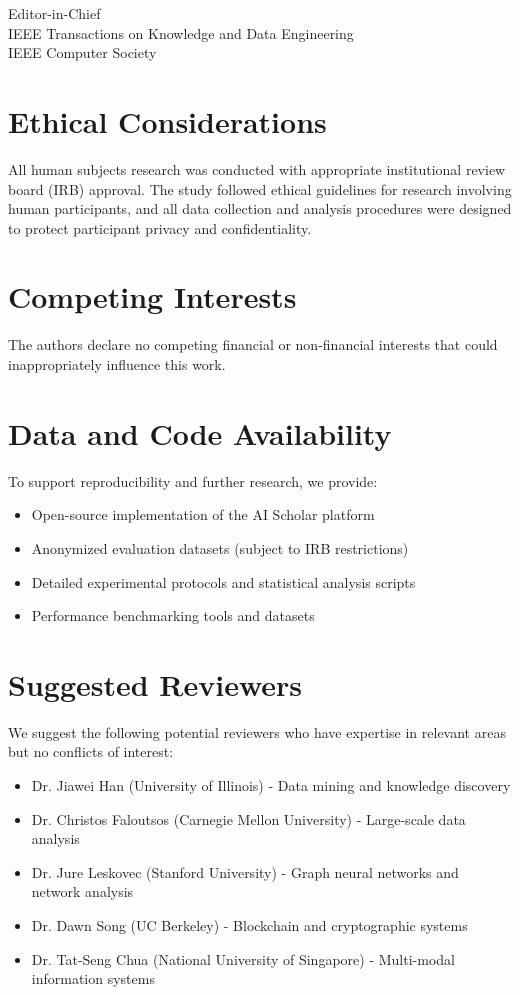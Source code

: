 \documentclass[11pt]{letter}
\begin{document}
\begin{letter}{Editor-in-Chief\\
IEEE Transactions on Knowledge and Data Engineering\\
IEEE Computer Society}
\section*{Ethical Considerations}

All human subjects research was conducted with appropriate institutional review board (IRB) approval. The study followed ethical guidelines for research involving human participants, and all data collection and analysis procedures were designed to protect participant privacy and confidentiality.

\section*{Competing Interests}

The authors declare no competing financial or non-financial interests that could inappropriately influence this work.

\section*{Data and Code Availability}

To support reproducibility and further research, we provide:

\begin{itemize}
    \item Open-source implementation of the AI Scholar platform
    \item Anonymized evaluation datasets (subject to IRB restrictions)
    \item Detailed experimental protocols and statistical analysis scripts
    \item Performance benchmarking tools and datasets
\end{itemize}

\section*{Suggested Reviewers}

We suggest the following potential reviewers who have expertise in relevant areas but no conflicts of interest:

\begin{itemize}
    \item Dr. Jiawei Han (University of Illinois) - Data mining and knowledge discovery
    \item Dr. Christos Faloutsos (Carnegie Mellon University) - Large-scale data analysis
    \item Dr. Jure Leskovec (Stanford University) - Graph neural networks and network analysis
    \item Dr. Dawn Song (UC Berkeley) - Blockchain and cryptographic systems
    \item Dr. Tat-Seng Chua (National University of Singapore) - Multi-modal information systems
\end{itemize}


\end{letter}
\end{document}
